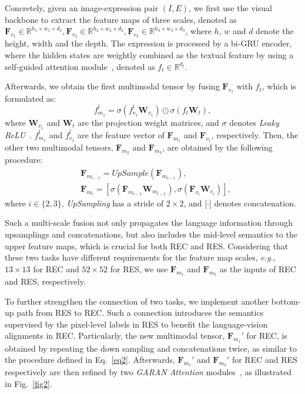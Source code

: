 \documentclass[10pt,twocolumn,letterpaper]{article}
\begin{document}
Concretely, given an image-expression pair $\left(I,E\right) $,  we first use the visual backbone to  extract the  feature maps of three scales, denoted as $\mathbf{F}_{v_1} \in \mathbb{R}^{{h_1} \times {w_1}\times   d_1}, \mathbf{F}_{v_2} \in \mathbb{R}^{{h_2}\times {w_2}\times   d_2}, \mathbf{F}_{v_3} \in \mathbb{R}^{{h_3}\times {w_3}\times   d_3}$,  where $h$, $w$ and $d$ denote the height, width and the depth.  The expression is processed by a bi-GRU encoder, where the  hidden states are weightly combined as the textual feature by using a self-guided attention module~\cite{yang2016hierarchical}, denoted as $f_t\in \mathbb{R}^{d_t}$.  

Afterwards, we   obtain the first multimodal tensor by fusing $\mathbf{F}_{v_1}$ with $f_t$, which is formulated as:
\begin{equation}
f_{m_1}^l=\sigma(f_{v_1}^l\mathbf{W}_{v_1}) \odot \sigma(f_t\mathbf{W}_t),
\label{eq1}
\end{equation}
where  $\mathbf{W}_{v_1}$ and $\mathbf{W}_{t}$ are the projection weight matrices, and $\sigma$ denotes  \emph{Leaky ReLU}~\cite{LRELU}.
$f_{m_1}^l$ and $f_{v_1}^l$ are the feature vector of $\mathbf{F}_{m_1}$ and $\mathbf{F}_{v_1}$, respectively. Then, the other two multimodal tensors, $\mathbf{F}_{m_2}$ and $\mathbf{F}_{m_3}$, are obtained by the following procedure: 
\begin{equation}
\begin{aligned}
&\mathbf{F}_{m_{i-1}}=UpSample(\mathbf{F}_{m_{i-1}}), \\
&\mathbf{F}_{m_{i}}=[\sigma(\mathbf{F}_{m_{i-1}}\mathbf{W}_{m_{i-1}}),\sigma( \mathbf{F}_{v_{i}}\mathbf{W}_{v_{i}})],
\end{aligned}
\label{eq2}
\end{equation}
where $i\in\{2,3\}$, \emph{UpSampling} has a stride of $2\times 2$,   and [$\cdot$] denotes concatenation. 

Such a multi-scale fusion   not only propagates the language information through upsamplings and concatenations, but also  includes the mid-level semantics to the upper feature maps, which is crucial for both REC and RES. Considering that these two tasks have different requirements for the feature map scales, \emph{e.g.}, $13\times13$ for REC  and $52\times 52$ for RES, we use  $\mathbf{F}_{m_1}$  and $\mathbf{F}_{m_3}$ as the inputs of REC and RES, respectively.

To further strengthen the connection of two tasks, we  implement another bottom-up path from RES to REC. 
Such a connection   introduces the semantics supervised by the pixel-level labels in RES to benefit the language-vision alignments in REC. Particularly, the new multimodal tensor,  $\mathbf{F}_{m_1}'$  for REC,  is obtained by repeating the down sampling and concatenations twice, as  similar to the procedure defined in Eq.~\ref{eq2}.  Afterwards,  $\mathbf{F}_{m_1}'$ and $\mathbf{F}_{m_3}'$ for REC and RES   respectively are then refined by two \emph{GARAN Attention} modules~\cite{zhou2019GIN}, as illustrated in Fig.~\ref{fig2}.
\end{document}
